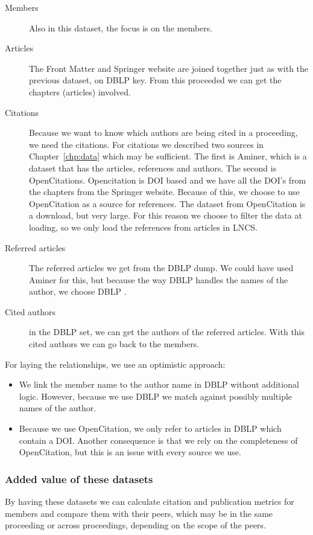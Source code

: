 \documentclass{ou-report}
\newcommand{\doi}{{DOI}}
\newcommand{\lncs}{LNCS}
\newcommand{\dblp}{DBLP}
\begin{document}
\begin{description}
    \item[Members] Also in this dataset, the focus is on the members.
    \item[Articles] The Front Matter and Springer website are joined together 
    just as with the previous dataset, on \dblp{} key. From this proceeded we
    can get the chapters (articles) involved.
    \item[Citations] Because we want to know which authors are being cited in 
    a proceeding, we need the citations. 
    For citations we described two sources in Chapter~\ref{chp:data} which may
    be 
    sufficient. The first is Aminer, which is a dataset that has the articles, 
    references and authors. The second is OpenCitations. Opencitation is \doi{}
    based and we have all the \doi{}'s from 
    the chapters from the Springer website. Because of this, we choose to use 
    OpenCitation as a source for references.
    The dataset from OpenCitation is a download, but very large. For this reason
    we choose to filter the data at loading, so we only load the references from
    articles in \lncs{}.
    \item[Referred articles] The referred articles we get from the \dblp{} dump.
    We could have used Aminer for this, but because the way \dblp{}  handles 
    the names of the author, we choose \dblp{} .
    \item[Cited authors] in the \dblp{} set, we can get the authors of the referred
    articles. With this cited authors we can go back to the members.
\end{description}
For laying the relationships, we use an optimistic approach:
\begin{itemize}
    \item We link the member name to the author name in \dblp{} without additional 
    logic. However, because we use \dblp{} we match against possibly multiple names
    of the author.
    \item Because we use OpenCitation, we only refer to articles in \dblp{} which 
    contain a \doi{}. Another consequence is that we rely on the completeness of
    OpenCitation, but this is an issue with every source we use.
\end{itemize}

\subsubsection{Added value of these datasets}
By having these datasets we can calculate citation and publication metrics for 
members and 
compare them with their peers, which may be in the same proceeding or across 
proceedings, depending on the scope of the peers.
\end{document}
